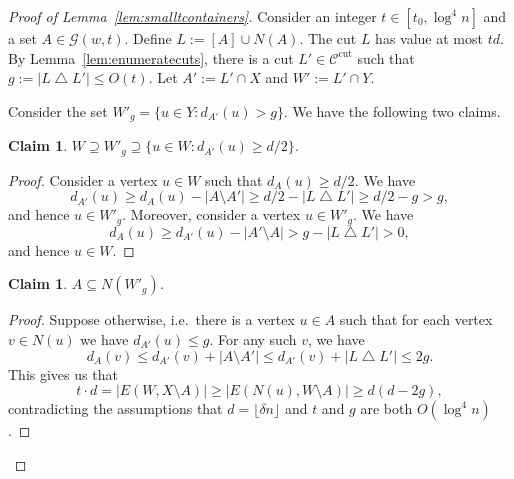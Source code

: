 \documentclass[11pt,letterpaper]{amsart}
\newtheorem{claim}[theorem]{Claim}
\theoremstyle{definition}
\newcommand{\oldqed}{}
\def\endofFact{\hfill\scalebox{.6}{$\blacksquare$}}
\newenvironment{claimproof}[1][Proof]{
  \renewcommand{\oldqed}{\qedsymbol}
  \renewcommand{\qedsymbol}{\endofFact}
  \begin{proof}[#1]
}{
  \end{proof}
  \renewcommand{\qedsymbol}{\oldqed}
}
\let\oldtriangle\triangle
\def\triangle{\mathbin{\oldtriangle}}
\newcommand*{\Ccut}{\mathcal{C}^{\mathrm{cut}}}
\begin{document}
\begin{proof}[Proof of Lemma~\ref{lem:smalltcontainers}]
Consider an integer $t \in [t_0,\log^4 n]$ and a set $A\in \mathcal{G}(w,t)$. Define $L := [A] \cup N(A)$. The cut $L$ has value at most $td$. 
By Lemma~\ref{lem:enumeratecuts}, there is a cut $L'\in\Ccut$ such that $g := |L \triangle L'| \leq O(t)$. Let $A' := L' \cap X$ and $W' := L' \cap Y$. 

Consider the set $W'_g = \{u \in Y : d_{A'}(u)> g\}$. We have the following two claims.

\begin{claim}\label{claim:essential1}
$W \supseteq W'_g \supseteq \{u \in W : d_{A'}(u) \geq d/2\}$.
\end{claim}


\begin{claimproof}
Consider a vertex $u \in W$ such that $d_A(u)\geq d/2$. We have
\[
d_{A'}(u)  \geq d_A(u) -  |A\setminus A'| \geq d/2 - |L \triangle L'| \geq d/2 - g > g,
\]
and hence $u \in W'_g$. Moreover, consider a vertex $u \in W'_g$. We have
\[
d_A(u) \geq d_{A'}(u) - |A' \setminus A| > g - |L \triangle L'| > 0,
\]
and hence $u \in W$.
\end{claimproof}

\begin{claim}\label{claim:essential2}
$A\subseteq N(W'_g)$.
\end{claim}

\begin{claimproof}
Suppose otherwise, i.e.\ there is a vertex $u\in A$ such that for each vertex $v \in N(u)$ we have $d_{A'}(u) \leq g$. For any such $v$, we have 
\[
d_A(v) \leq d_{A'}(v) + |A \setminus A'| \leq d_{A'}(v) + |L \triangle L'| \leq 2g.
\]
This gives us that 
\[
t \cdot d = |E(W,X \setminus A)| \geq |E(N(u), W\setminus A)| \geq d(d - 2g),
\]
contradicting the assumptions that $d=\lfloor\delta n\rfloor$ and $t$ and $g$ are both $O(\log^4 n)$.
\end{claimproof}


\end{proof}
\end{document}
